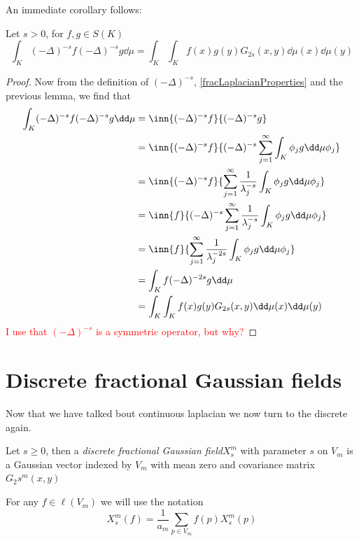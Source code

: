 An immediate corollary follows:
\begin{coro}
	Let $s > 0$, for $f,g \in S(K)$
	\begin{equation}
		\int_{K} (-\Delta)^{-s} f (-\Delta)^{-s} g \dd \mu = \int_{K}\int_{K} f(x)g(y)G_{2s}(x,y) \dd \mu(x) \dd \mu (y)
 	\end{equation}
\end{coro}
\begin{proof}
	Now from the definition of $(-\Delta)^{-s}$, \cref{fracLaplacianProperties} and the previous lemma, we find that
	\begin{align}
		\int_{K} (-\Delta)^{-s}f (-\Delta)^{-s}g \dd \mu &= \inn{(-\Delta)^{-s}f}{(-\Delta)^{-s}g} \\
		&= \inn{(-\Delta)^{-s}f}{(-\Delta)^{-s}\sum_{j = 1}^{\infty} \int_K\phi_j g \dd \mu\phi_j} \\
		& =\inn{(-\Delta)^{-s}f}{\sum_{j = 1}^{\infty} \frac{1}{\lambda_{j}^{-s}} \int_K\phi_j g \dd \mu \phi_j} \\
		 &= \inn{f}{(-\Delta)^{-s} \sum_{j = 1}^{\infty}\frac{1}{\lambda_{j}^{-s}} \int_K\phi_j g \dd \mu \phi_j} \\
		 &= \inn{f}{ \sum_{j = 1}^{\infty} \frac{1}{\lambda_{j}^{-2s}} \int_K \phi_j g \dd \mu \phi_j} \\
		 & = \int_{K}f (-\Delta)^{-2s}g \dd \mu \\
		 & =\int_{K}\int_{K} f(x)g(y)G_{2s}(x,y) \dd \mu(x) \dd \mu (y)
	\end{align}
	\textcolor{red}{I use that $(-\Delta)^{-s}$ is a symmetric operator, but why?} 
\end{proof}

\section{Discrete fractional Gaussian fields}
Now that we have talked bout continuous laplacian we now turn to the discrete again.

\begin{defi}
	Let $s \geq 0$, then a \emph{discrete fractional Gaussian field}$X_s^{m}$ with parameter $s$ on $V_m$ is a Gaussian vector indexed by $V_m$ with mean zero and covariance matrix $G_2s^{m}(x,y)$
\end{defi}

For any $f \in \ell(V_m)$ we will use the notation
\begin{equation}
	X_s^{m}(f) = \frac{1}{a_m}\sum_{p \in V_m}f(p)X^{m}_{s}(p)
\end{equation}

